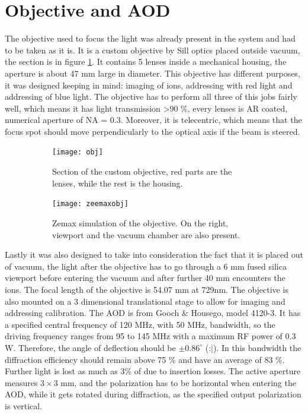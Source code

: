 \section{Objective and AOD}
\label{sec:obj}
The objective used to focus the light was already present in the system and had to be taken as it is. It is a custom objective by Sill optics placed outside vacuum, the section is in figure \ref{objsection}. It contains 5 lenses inside a mechanical housing, the aperture is about 47 mm large in diameter.
This objective has different purposes, it was designed keeping in mind: imaging of ions, addressing with red light and addressing of blue light. The objective has to perform all three of this jobs fairly well, which means it has light transmission >90 \%, every lenses is AR coated, numerical aperture of NA = 0.3. Moreover, it is telecentric, which means that the focus spot should move perpendicularly to the optical axis if the beam is steered.
\begin{figure}[H]
     \centering
     \begin{subfigure}[b]{0.4\textwidth}
         \centering
         \texttt{[image: obj]}
          \caption{Section of the custom objective, red parts are the lenses, while the rest is the housing.}
         \label{objsection}
     \end{subfigure}
     \hfill
     \begin{subfigure}[b]{0.55\textwidth}
         \centering
         \texttt{[image: zeemaxobj]}
         \vspace{1em}
         \caption{Zemax simulation of the objective. On the right, viewport and the vacuum chamber are also present.}

     \end{subfigure}
        \caption{}
\end{figure}
 Lastly it was also designed to take into consideration the fact that it is placed out of vacuum, the light after the objective has to go through a 6 mm fused silica viewport before entering the vacuum and after further 40 mm encounters the ions. The focal length of the objective is 54.07 mm at 729nm. The objective is also mounted on a 3 dimensional translational stage to allow for imaging and addressing calibration.
The AOD is from Gooch \& Housego, model 4120-3. It has a specified central frequency of 120 MHz, with 50 MHz, bandwidth, so the driving frequency ranges from 95 to 145 MHz with a maximum RF power of 0.3 W. Therefore, the angle of deflection should be $\pm 0.86^{\circ}$ (:|).  In this bandwidth the diffraction efficiency should remain above 75 \% and have an average of 83 \%. Further light is lost as much as 3\% of due to insertion losses. The active aperture measures $3\times 3$ mm, and the polarization has to be horizontal when entering the AOD, while it gets rotated during diffraction, as the specified output polarization is vertical.

